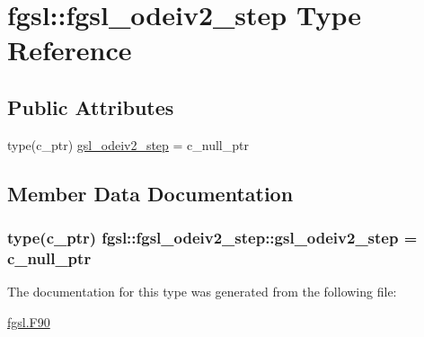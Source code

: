\hypertarget{structfgsl_1_1fgsl__odeiv2__step}{\section{fgsl\-:\-:fgsl\-\_\-odeiv2\-\_\-step Type Reference}
\label{structfgsl_1_1fgsl__odeiv2__step}
}
\subsection*{Public Attributes}
\begin{DoxyCompactItemize}
\item 
type(c\-\_\-ptr) \hyperlink{structfgsl_1_1fgsl__odeiv2__step_aeface4aae3056c0c9200d1d1573febd9}{gsl\-\_\-odeiv2\-\_\-step} = c\-\_\-null\-\_\-ptr
\end{DoxyCompactItemize}


\subsection{Member Data Documentation}
\hypertarget{structfgsl_1_1fgsl__odeiv2__step_aeface4aae3056c0c9200d1d1573febd9}{
\subsubsection[{gsl\-\_\-odeiv2\-\_\-step}]{\setlength{\rightskip}{0pt plus 5cm}type(c\-\_\-ptr) fgsl\-::fgsl\-\_\-odeiv2\-\_\-step\-::gsl\-\_\-odeiv2\-\_\-step = c\-\_\-null\-\_\-ptr}}\label{structfgsl_1_1fgsl__odeiv2__step_aeface4aae3056c0c9200d1d1573febd9}


The documentation for this type was generated from the following file\-:\begin{DoxyCompactItemize}
\item 
\hyperlink{fgsl_8F90}{fgsl.\-F90}\end{DoxyCompactItemize}
